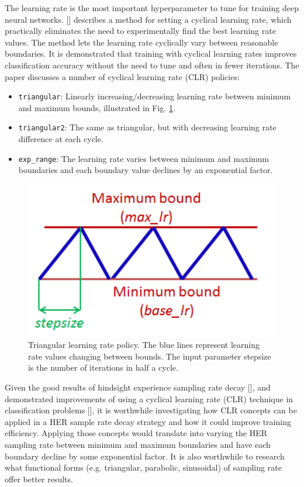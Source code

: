\documentclass[conference]{IEEEtran}
\begin{document}
The learning rate is the most important hyperparameter to tune for training deep neural networks. [\cite{smith2017cyclical}] describes a method for setting a cyclical learning rate, which practically eliminates the need to experimentally find the best learning rate values. The method lets the learning rate cyclically vary between reasonable boundaries. It is demonstrated that training with cyclical learning rates improves classification accuracy without the need to tune and often in fewer iterations. The paper discusses a number of cyclical learning rate (CLR) policies:
\begin{itemize}
    \item \texttt{triangular}: Linearly increasing/decreasing learning rate between minimum and maximum bounds, illustrated in Fig. \ref{fig:research_clr}.
    \item \texttt{triangular2}: The same as triangular, but with decreasing learning rate difference at each cycle.
    \item \texttt{exp\_range}: The learning rate varies between minimum and maximum boundaries and each boundary value declines by an exponential factor.
\end{itemize}
\begin{figure}[ht]
\centering
\includegraphics[width=0.7\columnwidth]{img/CLR.png}
\caption{Triangular learning rate policy. The blue lines represent learning rate values changing between bounds. The input parameter stepsize is the number of iterations in half a cycle.}
\label{fig:research_clr}
\end{figure}

Given the good results of hindsight experience sampling rate decay [\cite{vecchietti2020sampling}], and demonstrated improvements of using a cyclical learning rate (CLR) technique in classification problems [\cite{smith2017cyclical}], it is worthwhile investigating how CLR concepts can be applied in a HER sample rate decay strategy and how it could improve training efficiency. Applying those concepts would translate into varying the HER sampling rate between minimum and maximum boundaries and have each boundary decline by some exponential factor. It is also worthwhile to research what functional forms (e.g. triangular, parabolic, sinusoidal) of sampling rate offer better results.
\end{document}
